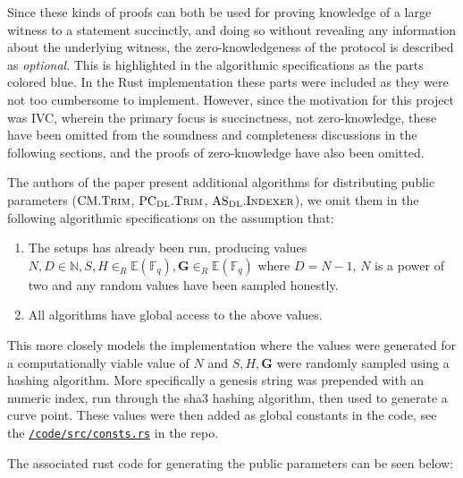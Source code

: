 \documentclass[
]{article}
\providecommand{\tightlist}{%
  \setlength{\itemsep}{0pt}\setlength{\parskip}{0pt}}
\newcommand*\Fb{\mathbb{F}}
\newcommand*\Nb{\mathbb{N}}
\newcommand*\Eb{\mathbb{E}}
\newcommand{\textblue}[1]{\textcolor{GbBlueDk}{#1}}
\renewcommand{\vec}[1]{ \boldsymbol{#1} }
\newcommand*{\Trim}{\mathrm{\text{T{\scriptsize RIM}}}}
\newcommand*{\PCDL}{\text{PC}_{\text{DL}}}
\newcommand*{\PCDLTrim}{\PCDL.\Trim}
\newcommand*{\ASDL}{\text{AS}_{\text{DL}}}
\newcommand*{\ASDLIndexer}{\ASDL.\mathrm{\text{I\scriptsize NDEXER}}}
\newcommand*{\CM}{\mathrm{\text{CM}}}
\newcommand*{\CMTrim}{\CM.\Trim}
\begin{document}
Since these kinds of proofs can both be used for proving knowledge of a
large witness to a statement succinctly, and doing so without revealing
any information about the underlying witness, the zero-knowledgeness of
the protocol is described as \emph{optional}. This is highlighted in the
algorithmic specifications as the parts colored \textblue{blue}. In the
Rust implementation these parts were included as they were not too
cumbersome to implement. However, since the motivation for this project
was IVC, wherein the primary focus is succinctness, not zero-knowledge,
these have been omitted from the soundness and completeness discussions
in the following sections, and the proofs of zero-knowledge have also
been omitted.

The authors of the paper present additional algorithms for distributing
public parameters (\(\CMTrim\), \(\PCDLTrim\), \(\ASDLIndexer\)), we
omit them in the following algorithmic specifications on the assumption
that:

\begin{enumerate}
\def\labelenumi{\alph{enumi}.}
\tightlist
\item
  The setups has already been run, producing values
  \(N, D \in \Nb, S, H \in_R
  \Eb(\Fb_q), \vec{G} \in_R \Eb(\Fb_q)\) where \(D = N - 1\), \(N\) is a
  power of two and any random values have been sampled honestly.
\item
  All algorithms have global access to the above values.
\end{enumerate}

This more closely models the implementation where the values were
generated for a computationally viable value of \(N\) and \(S, H,
\vec{G}\) were randomly sampled using a hashing algorithm. More
specifically a genesis string was prepended with an numeric index, run
through the sha3 hashing algorithm, then used to generate a curve point.
These values were then added as global constants in the code, see the
\href{https://github.com/rasmus-kirk/halo-accumulation/blob/main/code/src/consts.rs}{\texttt{/code/src/consts.rs}}
in the repo.

The associated rust code for generating the public parameters can be
seen below:
\end{document}
